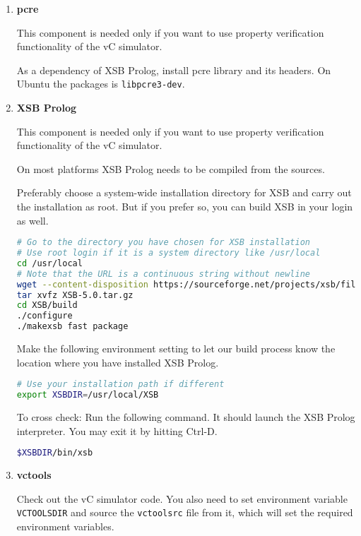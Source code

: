\documentclass[12pt,a4paper]{article}
\begin{document}
\begin{enumerate}
\newcommand{\verifonly}{This component is needed only if you want to use property verification functionality of the vC simulator.}

\item \textbf{pcre}

\verifonly

As a dependency of XSB Prolog, install pcre library and its headers. On Ubuntu the packages is \texttt{libpcre3-dev}.

\item \textbf{XSB Prolog}

\verifonly

On most platforms XSB Prolog needs to be compiled from the sources.

Preferably choose a system-wide installation directory for XSB and carry out the installation as root. But if you prefer so, you can build XSB in your login as well.

\begin{lstlisting}[language=bash,style=snippet]
# Go to the directory you have chosen for XSB installation
# Use root login if it is a system directory like /usr/local
cd /usr/local
# Note that the URL is a continuous string without newline
wget --content-disposition https://sourceforge.net/projects/xsb/files/xsb/5.0%20%28Green%20Tea%29/XSB-5.0.tar.gz/download
tar xvfz XSB-5.0.tar.gz
cd XSB/build
./configure
./makexsb fast package
\end{lstlisting}

Make the following environment setting to let our build process know the location where you have installed XSB Prolog.

\begin{lstlisting}[language=bash,style=snippet]
# Use your installation path if different
export XSBDIR=/usr/local/XSB
\end{lstlisting}

To cross check: Run the following command. It should launch the XSB Prolog interpreter. You may exit it by hitting Ctrl-D.

\begin{lstlisting}[language=bash,style=snippet]
$XSBDIR/bin/xsb
\end{lstlisting}

\item \textbf{vctools}

Check out the vC simulator code. You also need to set environment variable \texttt{VCTOOLSDIR} and source the \texttt{vctoolsrc} file from it, which will set the required environment variables.


\end{enumerate}
\end{document}
